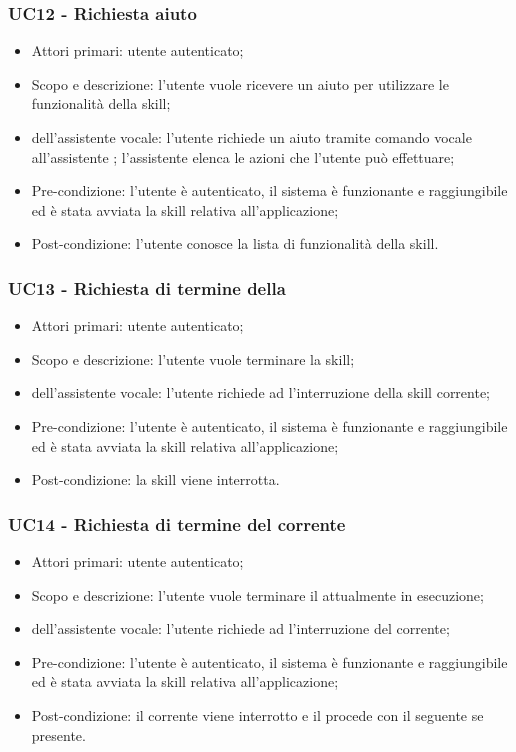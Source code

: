 \subsubsection{UC12 - Richiesta aiuto}
\begin{itemize}
	\item Attori primari: utente autenticato;
	\item Scopo e descrizione: l'utente vuole ricevere un aiuto per utilizzare le funzionalità della skill;
	\item {} dell'assistente vocale: l'utente richiede un aiuto tramite comando vocale all'assistente  ; l'assistente elenca le azioni che l'utente può effettuare;
	\item Pre-condizione: l'utente è autenticato, il sistema è funzionante e raggiungibile ed è stata avviata la skill relativa all'applicazione;
	\item Post-condizione: l'utente conosce la lista di funzionalità della skill.
\end{itemize}

\subsubsection{UC13 - Richiesta di termine della }
\begin{itemize}
	\item Attori primari: utente autenticato;
	\item Scopo e descrizione: l'utente vuole terminare la skill;
	\item {} dell'assistente vocale: l'utente richiede ad   l'interruzione della skill corrente;
	\item Pre-condizione: l'utente è autenticato, il sistema è funzionante e raggiungibile ed è stata avviata la skill relativa all'applicazione;
	\item Post-condizione: la skill viene interrotta.
\end{itemize}

\subsubsection{UC14 - Richiesta di termine del  corrente}
\begin{itemize}
	\item Attori primari: utente autenticato;
	\item Scopo e descrizione: l'utente vuole terminare il  attualmente in esecuzione;
	\item {} dell'assistente vocale: l'utente richiede ad   l'interruzione del  corrente;
	\item Pre-condizione: l'utente è autenticato, il sistema è funzionante e raggiungibile ed è stata avviata la skill relativa all'applicazione;
	\item Post-condizione: il  corrente viene interrotto e il  procede con il  seguente se presente.
\end{itemize}

